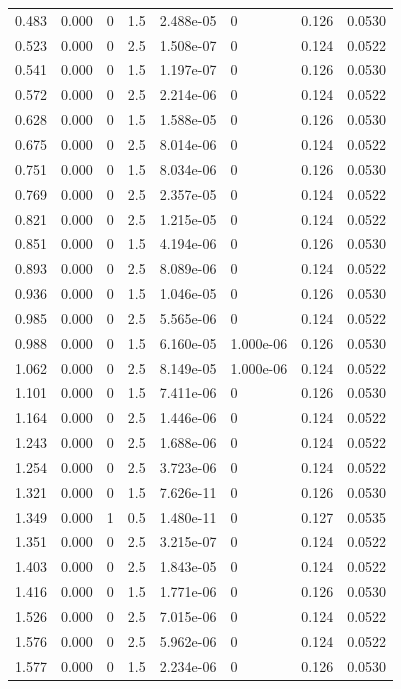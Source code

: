 \documentclass[preview]{standalone}
\begin{document}
{{\begin{tabular}{L{1.2cm}C{1.2cm} C{0.3cm}C{0.5cm} C{1.4cm}C{1.4cm} C{1.4cm}C{1.4cm}}
  0.483  &  0.000  & 0     & 1.5 &  2.488e-05  & 0  & 0.126 &  0.0530   \\ 
  0.523  &  0.000  & 0     & 2.5 &  1.508e-07  & 0  & 0.124 &  0.0522   \\ 
  0.541  &  0.000  & 0     & 1.5 &  1.197e-07  & 0  & 0.126 &  0.0530   \\ 
  0.572  &  0.000  & 0     & 2.5 &  2.214e-06  & 0  & 0.124 &  0.0522   \\ 
  0.628  &  0.000  & 0     & 1.5 &  1.588e-05  & 0  & 0.126 &  0.0530   \\ 
  0.675  &  0.000  & 0     & 2.5 &  8.014e-06  & 0  & 0.124 &  0.0522   \\ 
  0.751  &  0.000  & 0     & 1.5 &  8.034e-06  & 0  & 0.126 &  0.0530   \\ 
  0.769  &  0.000  & 0     & 2.5 &  2.357e-05  & 0  & 0.124 &  0.0522   \\ 
  0.821  &  0.000  & 0     & 2.5 &  1.215e-05  & 0  & 0.124 &  0.0522   \\ 
  0.851  &  0.000  & 0     & 1.5 &  4.194e-06  & 0  & 0.126 &  0.0530   \\ 
  0.893  &  0.000  & 0     & 2.5 &  8.089e-06  & 0  & 0.124 &  0.0522   \\ 
  0.936  &  0.000  & 0     & 1.5 &  1.046e-05  & 0  & 0.126 &  0.0530   \\ 
  0.985  &  0.000  & 0     & 2.5 &  5.565e-06  & 0  & 0.124 &  0.0522   \\ 
  0.988  &  0.000  & 0     & 1.5 &  6.160e-05  & 1.000e-06  & 0.126 &  0.0530   \\ 
  1.062  &  0.000  & 0     & 2.5 &  8.149e-05  & 1.000e-06  & 0.124 &  0.0522   \\ 
  1.101  &  0.000  & 0     & 1.5 &  7.411e-06  & 0  & 0.126 &  0.0530   \\ 
  1.164  &  0.000  & 0     & 2.5 &  1.446e-06  & 0  & 0.124 &  0.0522   \\ 
  1.243  &  0.000  & 0     & 2.5 &  1.688e-06  & 0  & 0.124 &  0.0522   \\ 
  1.254  &  0.000  & 0     & 2.5 &  3.723e-06  & 0  & 0.124 &  0.0522   \\ 
  1.321  &  0.000  & 0     & 1.5 &  7.626e-11  & 0  & 0.126 &  0.0530   \\ 
  1.349  &  0.000  & 1     & 0.5 &  1.480e-11  & 0  & 0.127 &  0.0535   \\ 
  1.351  &  0.000  & 0     & 2.5 &  3.215e-07  & 0  & 0.124 &  0.0522   \\ 
  1.403  &  0.000  & 0     & 2.5 &  1.843e-05  & 0  & 0.124 &  0.0522   \\ 
  1.416  &  0.000  & 0     & 1.5 &  1.771e-06  & 0  & 0.126 &  0.0530   \\ 
  1.526  &  0.000  & 0     & 2.5 &  7.015e-06  & 0  & 0.124 &  0.0522   \\ 
  1.576  &  0.000  & 0     & 2.5 &  5.962e-06  & 0  & 0.124 &  0.0522   \\ 
  1.577  &  0.000  & 0     & 1.5 &  2.234e-06  & 0  & 0.126 &  0.0530   \\ 
\hline 
\end{tabular} 

}}
\end{document}

